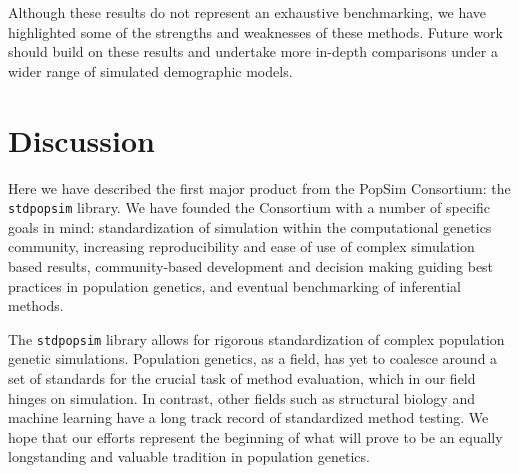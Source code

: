 \documentclass[12pt,halfline,a4paper]{ouparticle}
\newcommand{\stdpopsim}{\texttt{stdpopsim}\xspace}
\begin{document}
Although these results do not represent an exhaustive benchmarking,
we have highlighted some of the strengths and weaknesses of these methods.
Future work should build on these results and undertake more in-depth comparisons
under a wider range of simulated demographic models.

\section*{Discussion}

Here we have described the first major product from the PopSim Consortium:
the \stdpopsim library. We have founded the Consortium with a number of specific goals in mind:
standardization of simulation within the computational genetics community,
increasing reproducibility and ease of use of complex simulation based results,
community-based development and decision making guiding best practices in population genetics,
and eventual benchmarking of inferential methods.

The \stdpopsim library allows for rigorous
standardization of complex population genetic simulations. Population genetics, as a field,
has yet to coalesce around a set of standards for the crucial task of method
evaluation, which in our field hinges on simulation. In contrast, other fields such as
structural biology \citep{moult1995large} and machine learning \citep{russakovsky2015imagenet} have a long track record
of standardized method testing. We hope that our efforts represent the beginning of what
will prove to be an equally longstanding and valuable tradition in population genetics.


\end{document}
